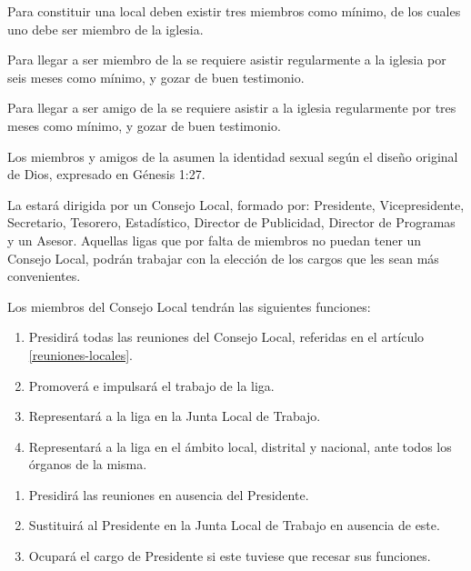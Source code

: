 

\article
Para constituir una \LMJ{} local deben existir tres miembros como mínimo, de los cuales uno debe ser miembro de la iglesia.

\article
\label{membresia-liga}
Para llegar a ser miembro de la \LMJ{} se requiere asistir regularmente a la iglesia por seis meses como mínimo, y gozar de buen testimonio.

\article
\label{amigo-liga}
Para llegar a ser amigo de la \LMJ{} se requiere asistir a la iglesia regularmente por tres meses como mínimo, y gozar de buen testimonio.

\article
\label{identidad-sexual}
Los miembros y amigos de la \LMJ{} asumen la identidad sexual según el diseño original de Dios, expresado en Génesis 1:27.

\article
La \LMJ{} estará dirigida por un Consejo Local, formado por: Presidente, Vicepresidente, Secretario, Tesorero, Estadístico, Director de Publicidad, Director de Programas y un Asesor.
Aquellas ligas que por falta de miembros no puedan tener un Consejo Local, podrán trabajar con la elección de los cargos que les sean más convenientes.

\article
Los miembros del Consejo Local tendrán las siguientes funciones:

\begin{enumerate}[noitemsep]
    \item Presidirá todas las reuniones del Consejo Local, referidas en el artículo \ref{reuniones-locales}.
    \item Promoverá e impulsará el trabajo de la liga.
    \item Representará a la liga en la Junta Local de Trabajo.
    \item Representará a la liga en el ámbito local, distrital y nacional, ante todos los órganos de la misma.
\end{enumerate}

\begin{enumerate}[noitemsep]
    \item Presidirá las reuniones en ausencia del Presidente.
    \item Sustituirá al Presidente en la Junta Local de Trabajo en ausencia de este.
    \item Ocupará el cargo de Presidente si este tuviese que recesar sus funciones.
\end{enumerate}

